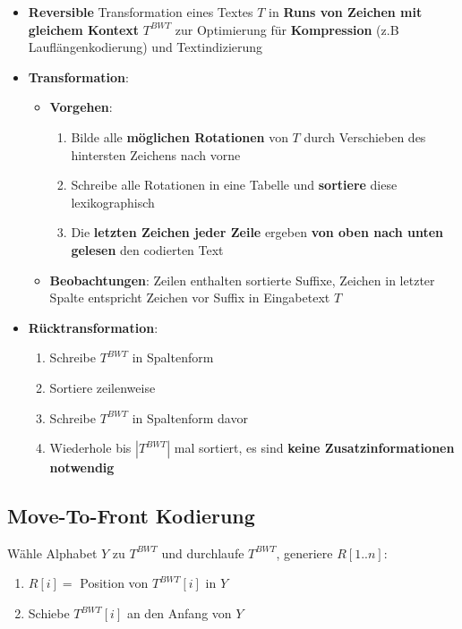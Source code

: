 \documentclass[10pt,a4paper]{article}
\begin{document}
	\begin{itemize}
		\item \textbf{Reversible} Transformation eines Textes $T$ in \textbf{Runs von Zeichen mit gleichem Kontext} $T^{BWT}$ zur Optimierung für \textbf{Kompression} (z.B Lauflängenkodierung) und Textindizierung
		\item \textbf{Transformation}:
		\begin{itemize}
			\item \textbf{Vorgehen}:
			\begin{enumerate}
				\item Bilde alle \textbf{möglichen Rotationen} von $T$ durch Verschieben des hintersten Zeichens nach vorne
				\item Schreibe alle Rotationen in eine Tabelle und \textbf{sortiere} diese lexikographisch
				\item Die \textbf{letzten Zeichen jeder Zeile} ergeben \textbf{von oben nach unten gelesen} den codierten Text
			\end{enumerate}
			\item \textbf{Beobachtungen}: Zeilen enthalten sortierte Suffixe, Zeichen in letzter Spalte entspricht Zeichen vor Suffix in Eingabetext $T$
		\end{itemize}
		\item \textbf{Rücktransformation}:
		\begin{enumerate}
			\item Schreibe $T^{BWT}$ in Spaltenform
			\item Sortiere zeilenweise
			\item Schreibe $T^{BWT}$ in Spaltenform davor
			\item Wiederhole bis $|T^{BWT}|$ mal sortiert, es sind \textbf{keine Zusatzinformationen notwendig}
		\end{enumerate}
	\end{itemize}

	\subsection{Move-To-Front Kodierung}
	\label{bwt:sub:move_to_front_kodierung}
	
	Wähle Alphabet $Y$ zu $T^{BWT}$ und durchlaufe $T^{BWT}$, generiere $R[1..n]$:
	\begin{enumerate}
		\item $R[i] = $ Position von $T^{BWT}[i]$ in $Y$
		\item Schiebe $T^{BWT}[i]$ an den Anfang von $Y$
	\end{enumerate}
\end{document}
